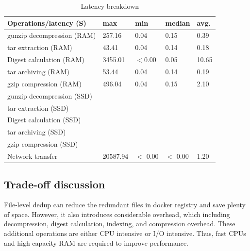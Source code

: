 \begin{table} 
	\centering 
	\scriptsize  
	\caption{Latency breakdown} \label{tbl:latency_breakdown} 
	\begin{tabular}{|l|l|l|l|l|}%
		\hline 
		Operations/latency (S) & max & min & median & avg.\\
		\hline
		 gunzip decompression (RAM) & 257.16  & 0.04  & 0.15  & 0.39 \\
 		\hline
 		tar extraction (RAM) & 43.41  & 0.04  &  0.14  & 0.18 \\
		\hline
		Digest calculation (RAM) & 3455.01  & $<$0.00  & 0.05 & 10.65 \\
		\hline
		tar archiving (RAM)  & 53.44 & 0.04 & 0.14 & 0.19\\
		\hline
		gzip compression (RAM) & 496.04 & 0.04 & 0.15 & 2.10 \\
		\hline
 		\hline
 		gunzip decompression (SSD) &   &   &    &  \\
 		\hline
 		tar extraction (SSD) &   &   &    &  \\
		\hline
		Digest calculation (SSD) &  &  & & \\
		\hline
		tar archiving (SSD) &  &  & & \\
		\hline
		gzip compression (SSD) & &  &  & \\
		\hline
		\hline
		Network transfer & 20587.94 & $<$ 0.00 & $<$ 0.00 & 1.20 \\
		\hline 	
	\end{tabular} 
\end{table}

\subsection{Trade-off discussion}

File-level dedup can reduce the redundant files in docker registry and save plenty of space. However, it also introduces considerable overhead, which including decompression, digest calculation, indexing, and compression overhead. These additional operations are either CPU intensive or I/O intensive. Thus, fast CPUs and high capacity RAM are required to improve performance.

